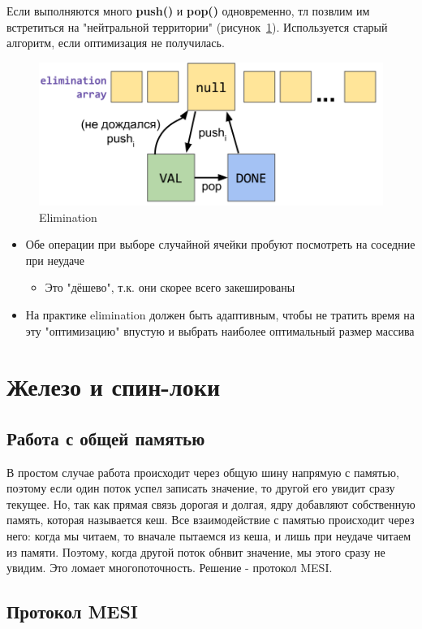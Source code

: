 \documentclass[10pt,a4paper,oneside,titlepage]{article}
\theoremstyle{plain}
\theoremstyle{defenition}
\begin{document}
Если выполняются много {\bfseries push()} и {\bfseries pop()} одновременно, тл позвлим им встретиться на "нейтральной территории" (рисунок~\ref{fig:elimination}). Используется старый алгоритм, если оптимизация не получилась.

\begin{figure}[h!]
	\centering
	\includegraphics[width=0.4\linewidth]{pictures/Elimination}
	\caption{Elimination}
	\label{fig:elimination}
\end{figure}

\begin{itemize}
	\item Обе операции при выборе случайной ячейки пробуют посмотреть на соседние при неудаче
	\begin{itemize}
		\item Это "дёшево", т.к. они скорее всего закешированы
	\end{itemize}
    \item На практике elimination должен быть адаптивным, чтобы не тратить время на эту "оптимизацию" впустую и выбрать наиболее оптимальный размер массива
\end{itemize}


\section{Железо и спин-локи}

\subsection{Работа с общей памятью}

В простом случае работа происходит через общую шину напрямую с памятью, поэтому если один поток успел записать значение, то другой его увидит сразу текущее. Но, так как прямая связь дорогая и долгая, ядру добавляют собственную память, которая называется кеш. Все взаимодействие с памятью происходит через него: когда мы читаем, то вначале пытаемся из кеша, и лишь при неудаче читаем из памяти. Поэтому, когда другой поток обнвит значение, мы этого сразу не увидим. Это ломает многопоточность. Решение - протокол MESI.

\subsection[MESI]{Протокол MESI}
\end{document}
